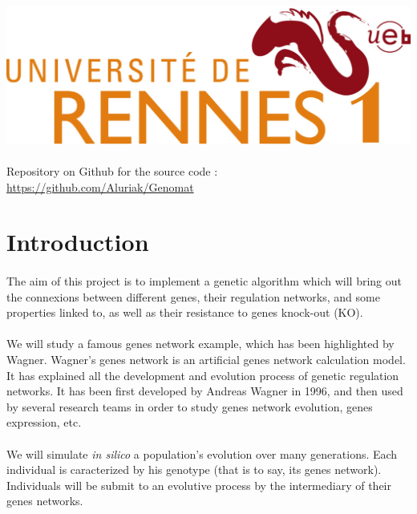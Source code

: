 \documentclass[]{report} %
\begin{document}
\begin{titlepage}
\includegraphics{rennes1_logo.png}\\[1cm] %


\paragraph*{}
Repository on Github for the source code :\\ \url{https://github.com/Aluriak/Genomat}

\end{titlepage}

\section*{Introduction}
	\paragraph*{}
	The aim of this project is to implement a genetic algorithm which will bring out the connexions between different genes, 
        their regulation networks, and some properties linked to, as well as their resistance to genes knock-out (KO).
	\paragraph*{}
	We will study a famous genes network example, which has been highlighted by Wagner. Wagner's genes network is an artificial genes network calculation model. 
        It has explained all the development and evolution process of genetic regulation networks. It has been first developed by Andreas Wagner in 1996, 
        and then used by several research teams in order to study genes network evolution, genes expression, etc.
	\paragraph*{}
	We will simulate \textit{in silico} a population's evolution over many generations. Each individual is caracterized by his genotype 
        (that is to say, its genes network). 
        Individuals will be submit to an evolutive process by the intermediary of their genes networks.
\end{document}
